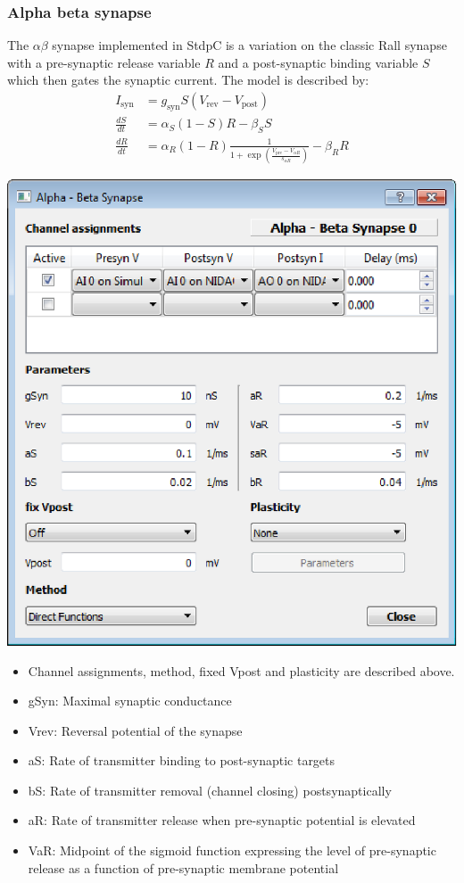 \documentclass{article}
\begin{document}
\subsubsection{Alpha beta synapse}
The $\alpha\beta$ synapse implemented in StdpC is a variation on the
classic Rall synapse \cite{Rall1967} with a pre-synaptic release variable $R$ and a
post-synaptic binding variable $S$ which then gates the synaptic
current. The model is described by:
\begin{align}
I_{\text{syn}}&= g_{\text{syn}} S (V_{\text{rev}} -
V_{\text{post}}) \\
 \frac{dS}{dt} &= \alpha_S (1-S)R - \beta_S S  \\
 \frac{dR}{dt} &= \alpha_R (1-R) \frac{1}{1+
   \exp (\frac{V_{\text{pre}}-V_{\alpha R}}{s_{\alpha R}})} -
 \beta_R R  
\end{align}
\parbox[b]{0.48\textwidth}{
\includegraphics[scale=0.5]{abSynDialog}\\}
\hfill
\parbox[b]{0.5\textwidth}{
\begin{itemize}
\item Channel assignments, method, fixed Vpost and plasticity are described above.
\item gSyn: Maximal synaptic conductance
\item Vrev: Reversal potential of the synapse
\item aS: Rate of transmitter binding to post-synaptic targets
\item bS: Rate of transmitter removal (channel closing)
  postsynaptically
\item aR: Rate of transmitter release when pre-synaptic potential is
  elevated
\item VaR: Midpoint of the sigmoid function expressing the level of
  pre-synaptic release as a function of pre-synaptic membrane
  potential
\end{itemize}
}
\end{document}
